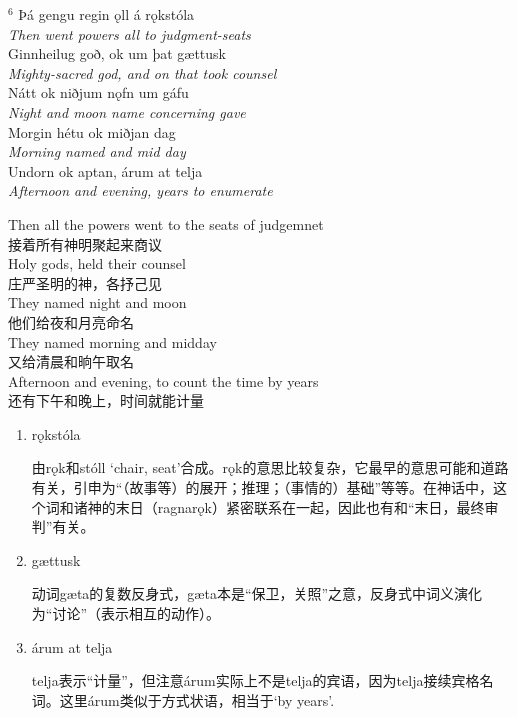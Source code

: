 \begin{paracol}{2}
    \noindent
    $^6 $ Þá gengu regin ǫll á rǫkstóla\\
    \textit{Then went powers all to judgment-seats}\\
    Ginnheilug goð, ok um þat gættusk\\
    \textit{Mighty-sacred god, and on that took counsel}\\
    Nátt ok niðjum nǫfn um gáfu\\
    \textit{Night and moon name concerning gave}\\
    Morgin hétu ok miðjan dag\\
    \textit{Morning named and mid day}\\
    Undorn ok aptan, árum at telja\\
    \textit{Afternoon and evening, years to enumerate}\\

    \switchcolumn

    \noindent
    Then all the powers went to the seats of judgemnet\\
    接着所有神明聚起来商议\\
    Holy gods, held their counsel\\
    庄严圣明的神，各抒己见\\
    They named night and moon\\
    他们给夜和月亮命名\\
    They named morning and midday\\
    又给清晨和晌午取名\\
    Afternoon and evening, to count the time by years\\
    还有下午和晚上，时间就能计量\\

\end{paracol}
\begin{grammar*}{}
    \begin{enumerate}[leftmargin=*]

        \item rǫkstóla

              由rǫk和stóll `chair, seat'合成。rǫk的意思比较复杂，它最早的意思可能和道路有关，引申为“（故事等）的展开；推理；（事情的）基础”等等。在神话中，这个词和诸神的末日（ragnarǫk）紧密联系在一起，因此也有和“末日，最终审判”有关。

        \item gættusk

              动词gæta的复数反身式，gæta本是“保卫，关照”之意，反身式中词义演化为“讨论”（表示相互的动作）。

        \item árum at telja

              telja表示“计量”，但注意árum实际上不是telja的宾语，因为telja接续宾格名词。这里árum类似于方式状语，相当于`by years'.
    \end{enumerate}
\end{grammar*}
\medskip %

